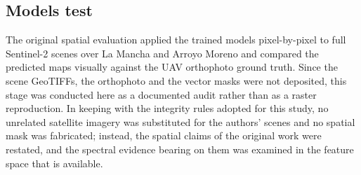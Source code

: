 \documentclass[10pt,twocolumn,a4paper]{article}
\begin{document}
\subsection{Models test}
\label{sec:methods-modelstest}

The original spatial evaluation applied the trained models pixel-by-pixel to full Sentinel-2 scenes
over La Mancha and Arroyo Moreno and compared the predicted maps visually against the UAV
orthophoto ground truth. Since the scene GeoTIFFs, the orthophoto and the vector masks were not
deposited, this stage was conducted here as a documented audit rather than as a raster
reproduction. In keeping with the integrity rules adopted for this study, no unrelated satellite
imagery was substituted for the authors' scenes and no spatial mask was fabricated; instead, the
spatial claims of the original work were restated, and the spectral evidence bearing on them was
examined in the feature space that is available.
\end{document}
